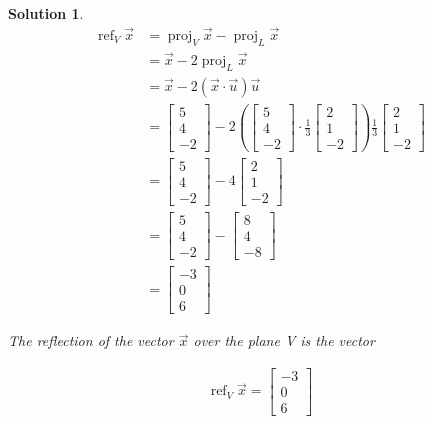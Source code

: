 \documentclass{article}
\newtheorem*{solution}{Solution}
\DeclareMathOperator{\proj}{proj}
\DeclareMathOperator{\refl}{ref}
\newcommand{\vectorproj}[2][]{\proj_{#1}#2}
\newcommand{\vectorrefl}[2][]{\refl_{#1}#2}
\begin{document}
\begin{solution}
\begin{align*}
\vectorrefl[V]{\vec{x}} &= \vectorproj[V]{\vec{x}} - \vectorproj[L]{\vec{x}} \\
&= \vec{x} - 2\vectorproj[L]{\vec{x}} \\
&= \vec{x} - 2(\vec{x} \cdot \vec{u}) \vec{u} \\
&= \begin{bmatrix} 5 \\ 4 \\ -2 \end{bmatrix} - 2\left(\begin{bmatrix} 5 \\ 4 \\ -2 \end{bmatrix} \cdot \frac{1}{3} \begin{bmatrix} 2 \\ 1 \\ -2 \end{bmatrix}\right) \frac{1}{3} \begin{bmatrix} 2 \\ 1 \\ -2 \end{bmatrix} \\
&= \begin{bmatrix} 5 \\ 4 \\ -2 \end{bmatrix} - 4 \begin{bmatrix} 2 \\ 1 \\ -2 \end{bmatrix} \\
&= \begin{bmatrix} 5 \\ 4 \\ -2 \end{bmatrix} - \begin{bmatrix} 8 \\ 4 \\ -8 \end{bmatrix} \\
&= \begin{bmatrix} -3 \\ 0 \\ 6 \end{bmatrix} 
\end{align*}

The reflection of the vector $\vec{x}$ over the plane V is the vector

\begin{align*}
\vectorrefl[V]\vec{x} = \begin{bmatrix} -3 \\ 0 \\ 6 \end{bmatrix} 
\end{align*}
\end{solution}
\end{document}
